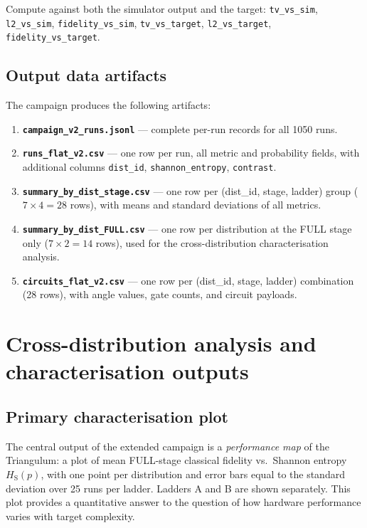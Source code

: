 \documentclass[11pt,a4paper]{article}
\newcommand{\HS}{H_{\mathrm{S}}}
\begin{document}
Compute against both the simulator output and the target:
\texttt{tv\_vs\_sim}, \texttt{l2\_vs\_sim}, \texttt{fidelity\_vs\_sim},
\texttt{tv\_vs\_target}, \texttt{l2\_vs\_target},
\texttt{fidelity\_vs\_target}.

\subsection{Output data artifacts}

The campaign produces the following artifacts:

\begin{enumerate}[label=\arabic*.]
  \item \textbf{\texttt{campaign\_v2\_runs.jsonl}} --- complete
    per-run records for all 1050 runs.
  \item \textbf{\texttt{runs\_flat\_v2.csv}} --- one row per run,
    all metric and probability fields, with additional columns
    \texttt{dist\_id}, \texttt{shannon\_entropy}, \texttt{contrast}.
  \item \textbf{\texttt{summary\_by\_dist\_stage.csv}} --- one row
    per (dist\_id, stage, ladder) group ($7 \times 4 = 28$ rows),
    with means and standard deviations of all metrics.
  \item \textbf{\texttt{summary\_by\_dist\_FULL.csv}} --- one row
    per distribution at the FULL stage only ($7 \times 2 = 14$ rows),
    used for the cross-distribution characterisation analysis.
  \item \textbf{\texttt{circuits\_flat\_v2.csv}} --- one row per
    (dist\_id, stage, ladder) combination (28 rows), with angle
    values, gate counts, and circuit payloads.
\end{enumerate}

\section{Cross-distribution analysis and characterisation outputs}
\label{sec:analysis}

\subsection{Primary characterisation plot}

The central output of the extended campaign is a
\emph{performance map} of the Triangulum: a plot of mean FULL-stage
classical fidelity vs.\ Shannon entropy $\HS(p)$, with one point per
distribution and error bars equal to the standard deviation over 25
runs per ladder. Ladders A and B are shown separately.
This plot provides a quantitative answer to the question of how
hardware performance varies with target complexity.
\end{document}
